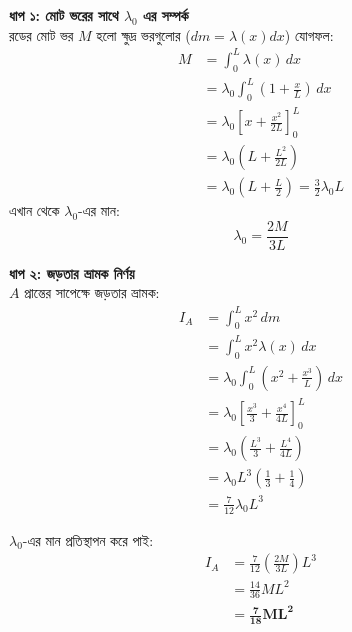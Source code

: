 \documentclass[12pt, a4paper]{article}
\begin{document}
\begin{tcolorbox}[solutionbox={সমাধান (Solution)}]
    \noindent
    \textbf{ধাপ ১: মোট ভরের সাথে $\lambda_0$ এর সম্পর্ক} \\
    রডের মোট ভর $M$ হলো ক্ষুদ্র ভরগুলোর ($dm = \lambda(x) dx$) যোগফল:
    \begin{align*}
        M &= \int_0^L \lambda(x) \, dx \\
          &= \lambda_0 \int_0^L \left(1 + \frac{x}{L}\right) \, dx \\
          &= \lambda_0 \left[ x + \frac{x^2}{2L} \right]_0^L \\
          &= \lambda_0 \left( L + \frac{L^2}{2L} \right) \\
          &= \lambda_0 \left( L + \frac{L}{2} \right) = \frac{3}{2} \lambda_0 L
    \end{align*}
    এখান থেকে $\lambda_0$-এর মান:
    \[ \lambda_0 = \frac{2M}{3L} \]
    
    \vspace{0.5em}
    \noindent\textbf{ধাপ ২: জড়তার ভ্রামক নির্ণয়} \\
    $A$ প্রান্তের সাপেক্ষে জড়তার ভ্রামক:
    \begin{align*}
        I_A &= \int_0^L x^2 \, dm \\
            &= \int_0^L x^2 \lambda(x) \, dx \\
            &= \lambda_0 \int_0^L \left( x^2 + \frac{x^3}{L} \right) \, dx \\
            &= \lambda_0 \left[ \frac{x^3}{3} + \frac{x^4}{4L} \right]_0^L \\
            &= \lambda_0 \left( \frac{L^3}{3} + \frac{L^4}{4L} \right) \\
            &= \lambda_0 L^3 \left( \frac{1}{3} + \frac{1}{4} \right) \\
            &= \frac{7}{12} \lambda_0 L^3
    \end{align*}
    
    $\lambda_0$-এর মান প্রতিস্থাপন করে পাই:
    \begin{align*}
        I_A &= \frac{7}{12} \left(\frac{2M}{3L}\right) L^3 \\
            &= \frac{14}{36} M L^2 \\
            &= \mathbf{\frac{7}{18} M L^2}
    \end{align*}
\end{tcolorbox}
\end{document}
